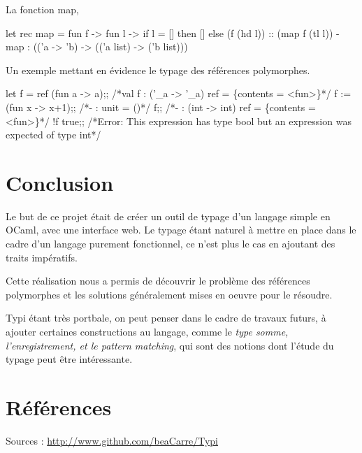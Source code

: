 \documentclass[a4paper, 11pt]{article}
\begin{document}
La fonction map,
\begin{OCamlEx}
let rec map = fun f -> fun l -> 
  if l = [] then []
  else (f (hd l)) :: (map f (tl l))
 - map : (('a -> 'b) -> (('a list) -> ('b list)))
\end{OCamlEx}

\newpage
Un exemple mettant en évidence le typage des références polymorphes.
\begin{OCamlEx}
let f = ref (fun a -> a);;
/*val f : ('\_a -> '\_a) ref = \{contents = <fun>\}*/
f := (fun x -> x+1);;
/*- : unit = ()*/
f;;
/*- : (int -> int) ref = \{contents = <fun>\}*/
!f true;;
/*Error: This expression has type bool but an expression was expected of type
         int*/
\end{OCamlEx}


\section*{Conclusion}

Le but de ce projet était de créer un outil de typage d'un langage simple en OCaml, avec une interface web.
Le typage étant naturel à mettre en place dans le cadre d'un langage purement fonctionnel, ce n'est plus le cas en ajoutant des traits impératifs.

Cette réalisation nous a permis de découvrir le problème des références polymorphes et les solutions généralement mises en oeuvre pour le résoudre.

Typi étant très portbale, on peut penser dans le cadre de travaux futurs, à ajouter certaines constructions au langage, comme le \emph{type somme, l'enregistrement, et le pattern matching}, qui sont des notions dont l'étude du typage peut être intéressante.



\newpage


\section*{Références}

Sources : \url{http://www.github.com/beaCarre/Typi}
\end{document}
